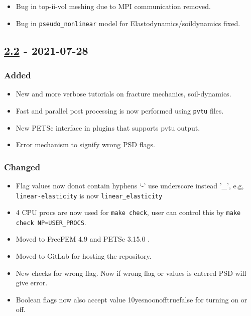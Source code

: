 \begin{itemize}
\tightlist
\item
  Bug in top-ii-vol meshing due to MPI communication removed.
\item
  Bug in \lstinline!pseudo_nonlinear! model for
  Elastodynamics/soildynamics fixed.
\end{itemize}

\subsection{\texorpdfstring{\href{https://gitlab.com/PsdSolver/psd_sources/-/tree/v2.2}{2.2}
- 2021-07-28}{2.2 - 2021-07-28}}\label{section}

\subsubsection{Added}\label{added-1}

\begin{itemize}
\tightlist
\item
  New and more verbose tutorials on fracture mechanics, soil-dynamics.
\item
  Fast and parallel post processing is now performed using
  \lstinline!pvtu! files.
\item
  New PETSc interface in plugins that supports pvtu output.
\item
  Error mechanism to signify wrong PSD flags.
\end{itemize}

\subsubsection{Changed}\label{changed-1}

\begin{itemize}
\tightlist
\item
  Flag values now donot contain hyphens `-' use underscore instead '\_',
  e.g, \lstinline!linear-elasticity! is now
  \lstinline!linear_elasticity!
\item
  4 CPU procs are now used for \lstinline!make check!, user can control
  this by \lstinline!make check NP=USER_PROCS!.
\item
  Moved to FreeFEM 4.9 and PETSc 3.15.0 .
\item
  Moved to GitLab for hosting the repository.
\item
  New checks for wrong flag. Now if wrong flag or values is entered PSD
  will give error.
\item
  Boolean flags now also accept value
  1\textbar{}0\textbar{}yes\textbar{}no\textbar{}on\textbar{}off\textbar{}true\textbar{}false
  for turning on or off.
\end{itemize}

